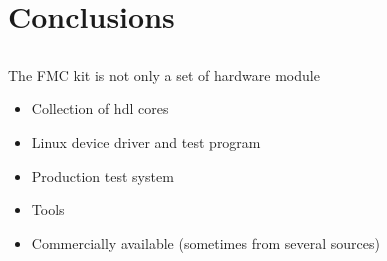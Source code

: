 \documentclass[compress,red]{beamer}
\begin{document}
\section{Conclusions}

\subsection*{} %

\begin{frame}{}

  \begin{block}{The FMC kit is not only a set of hardware module}
    \begin{itemize}
    \item Collection of hdl cores
    \item Linux device driver and test program
    \item Production test system
    \item Tools %
    \item Commercially available (sometimes from several sources)
    \end{itemize}
  \end{block}

\end{frame}




\end{document}
